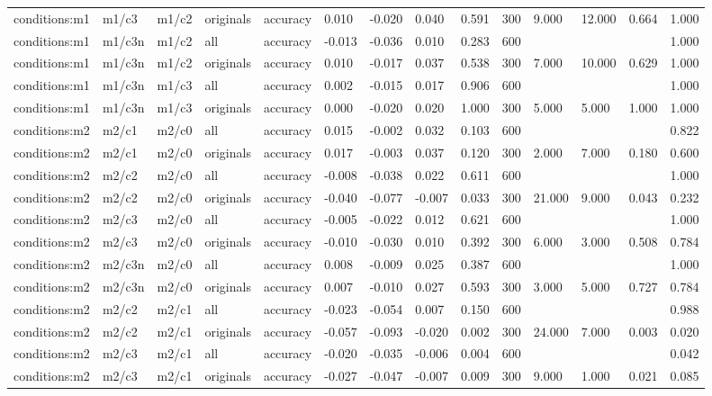 \begin{tabular}{llllllllllllll}
conditions:m1 & m1/c3 & m1/c2 & originals & accuracy & 0.010 & -0.020 & 0.040 & 0.591 & 300 & 9.000 & 12.000 & 0.664 & 1.000 \\
conditions:m1 & m1/c3n & m1/c2 & all & accuracy & -0.013 & -0.036 & 0.010 & 0.283 & 600 &  &  &  & 1.000 \\
conditions:m1 & m1/c3n & m1/c2 & originals & accuracy & 0.010 & -0.017 & 0.037 & 0.538 & 300 & 7.000 & 10.000 & 0.629 & 1.000 \\
conditions:m1 & m1/c3n & m1/c3 & all & accuracy & 0.002 & -0.015 & 0.017 & 0.906 & 600 &  &  &  & 1.000 \\
conditions:m1 & m1/c3n & m1/c3 & originals & accuracy & 0.000 & -0.020 & 0.020 & 1.000 & 300 & 5.000 & 5.000 & 1.000 & 1.000 \\
conditions:m2 & m2/c1 & m2/c0 & all & accuracy & 0.015 & -0.002 & 0.032 & 0.103 & 600 &  &  &  & 0.822 \\
conditions:m2 & m2/c1 & m2/c0 & originals & accuracy & 0.017 & -0.003 & 0.037 & 0.120 & 300 & 2.000 & 7.000 & 0.180 & 0.600 \\
conditions:m2 & m2/c2 & m2/c0 & all & accuracy & -0.008 & -0.038 & 0.022 & 0.611 & 600 &  &  &  & 1.000 \\
conditions:m2 & m2/c2 & m2/c0 & originals & accuracy & -0.040 & -0.077 & -0.007 & 0.033 & 300 & 21.000 & 9.000 & 0.043 & 0.232 \\
conditions:m2 & m2/c3 & m2/c0 & all & accuracy & -0.005 & -0.022 & 0.012 & 0.621 & 600 &  &  &  & 1.000 \\
conditions:m2 & m2/c3 & m2/c0 & originals & accuracy & -0.010 & -0.030 & 0.010 & 0.392 & 300 & 6.000 & 3.000 & 0.508 & 0.784 \\
conditions:m2 & m2/c3n & m2/c0 & all & accuracy & 0.008 & -0.009 & 0.025 & 0.387 & 600 &  &  &  & 1.000 \\
conditions:m2 & m2/c3n & m2/c0 & originals & accuracy & 0.007 & -0.010 & 0.027 & 0.593 & 300 & 3.000 & 5.000 & 0.727 & 0.784 \\
conditions:m2 & m2/c2 & m2/c1 & all & accuracy & -0.023 & -0.054 & 0.007 & 0.150 & 600 &  &  &  & 0.988 \\
conditions:m2 & m2/c2 & m2/c1 & originals & accuracy & -0.057 & -0.093 & -0.020 & 0.002 & 300 & 24.000 & 7.000 & 0.003 & 0.020 \\
conditions:m2 & m2/c3 & m2/c1 & all & accuracy & -0.020 & -0.035 & -0.006 & 0.004 & 600 &  &  &  & 0.042 \\
conditions:m2 & m2/c3 & m2/c1 & originals & accuracy & -0.027 & -0.047 & -0.007 & 0.009 & 300 & 9.000 & 1.000 & 0.021 & 0.085 \\

\end{tabular}
